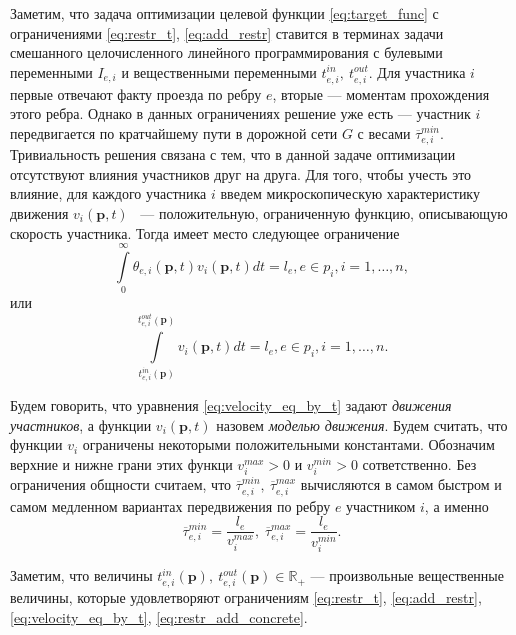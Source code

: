\documentclass[12pt, a4paper]{article}
\begin{document}
Заметим, что задача оптимизации целевой функции \eqref{eq:target_func} с ограничениями \eqref{eq:restr_t}, \eqref{eq:add_restr} ставится в терминах задачи смешанного целочисленного линейного программирования \cite{min_ip_tsp} с булевыми переменными $I_{e, i}$ и вещественными переменными $t_{e, i}^{in}, \: t_{e, i}^{out}$. Для участника $i$ первые отвечают факту проезда по ребру $e$, вторые --- моментам прохождения этого ребра. Однако в данных ограничениях решение уже есть --- участник $i$ передвигается по кратчайшему пути в дорожной сети $G$ с весами $\overline{\tau}_{e, i}^{min}$. Тривиальность решения связана с тем, что в данной задаче оптимизации отсутствуют влияния участников друг на друга. Для того, чтобы учесть это влияние, для каждого участника $i$ введем микроскопическую характеристику движения $v_i(\textbf{p}, t)$ ~--- положительную, ограниченную функцию, описывающую скорость участника.
Тогда имеет место следующее ограничение
\begin{equation}
	\label{eq:velocity_eq_by_theta}
	\int\limits_{0}^{\infty} \theta_{e, i} (\textbf{p}, t) v_i(\textbf{p}, t) dt = l_e, e \in p_i, i = 1, \dots, n,
\end{equation}
или
\begin{equation}
	\label{eq:velocity_eq_by_t}
	\int\limits_{t_{e, i}^{in}(\textbf{p})}^{t_{e, i}^{out}(\textbf{p})} v_i(\textbf{p}, t) dt = l_e, e \in p_i, i = 1, \dots, n.
\end{equation}

Будем говорить, что уравнения \eqref{eq:velocity_eq_by_t} задают \textit{движения участников}, а функции $v_i(\textbf{p}, t)$ назовем \textit{моделью движения}. Будем считать, что функции $v_i$ ограничены некоторыми положительными константами. Обозначим верхние и нижне грани этих функци  $v_i^{max} > 0$ и $v_i^{min} > 0$ сответственно. Без ограничения общности считаем, что $\overline{\tau}_{e, i}^{min}, \: \overline{\tau}_{e, i}^{max}$ вычисляются в самом быстром и самом медленном вариантах передвижения по ребру $e$ участником $i$, а именно
\begin{equation}
	\label{eq:restr_add_concrete}
	\overline{\tau}_{e, i}^{min} = \frac{l_e}{v_i^{max}}, \; \overline{\tau}_{e, i}^{max} = \frac{l_e}{v_i^{min}}.
\end{equation}

Заметим, что величины $t_{e, i}^{in}(\textbf{p}), \: t_{e, i}^{out}(\textbf{p}) \in \mathbb{R}_+$ --- произвольные вещественные величины, которые удовлетворяют ограничениям \eqref{eq:restr_t}, \eqref{eq:add_restr}, \eqref{eq:velocity_eq_by_t}, \eqref{eq:restr_add_concrete}.
\end{document}
